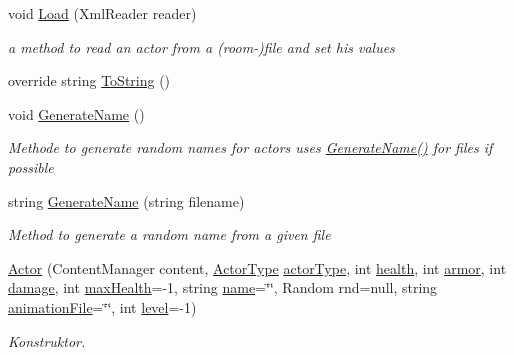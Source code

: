 \begin{DoxyCompactItemize}
void \hyperlink{class_gruppe22_1_1_backend_1_1_actor_abab30b54b556a93fb68044299f57a13f}{Load} (Xml\-Reader reader)
\begin{DoxyCompactList}\small\item\em a method to read an actor from a (room-\/)file and set his values \end{DoxyCompactList}\item 
override string \hyperlink{class_gruppe22_1_1_backend_1_1_actor_a8aee9e4883cce82a031244e62a725077}{To\-String} ()
\item 
void \hyperlink{class_gruppe22_1_1_backend_1_1_actor_a91da621907674e6fd7403143a609e858}{Generate\-Name} ()
\begin{DoxyCompactList}\small\item\em Methode to generate random names for actors uses \hyperlink{class_gruppe22_1_1_backend_1_1_actor_a91da621907674e6fd7403143a609e858}{Generate\-Name()} for files if possible \end{DoxyCompactList}\item 
string \hyperlink{class_gruppe22_1_1_backend_1_1_actor_ab355b820e866805831fde9aa92064549}{Generate\-Name} (string filename)
\begin{DoxyCompactList}\small\item\em Method to generate a random name from a given file \end{DoxyCompactList}\item 
\hyperlink{class_gruppe22_1_1_backend_1_1_actor_ab11640b7f9bced587bf5a568197194c4}{Actor} (Content\-Manager content, \hyperlink{namespace_gruppe22_1_1_backend_a56d8f7bd1b5ba29d421c27a959523af3}{Actor\-Type} \hyperlink{class_gruppe22_1_1_backend_1_1_actor_a58c387d62c241bbafdb677144f121afb}{actor\-Type}, int \hyperlink{class_gruppe22_1_1_backend_1_1_actor_a46f3a7d62de83a6bf3c44cd52f38af9b}{health}, int \hyperlink{class_gruppe22_1_1_backend_1_1_actor_ab400f0b82f96d2334891d7cd428f5d08}{armor}, int \hyperlink{class_gruppe22_1_1_backend_1_1_actor_a461e2480a59de23517c3b375dede10fb}{damage}, int \hyperlink{class_gruppe22_1_1_backend_1_1_actor_aac0f2f9a2f0b314f98ba19d0b38a7a97}{max\-Health}=-\/1, string \hyperlink{class_gruppe22_1_1_backend_1_1_actor_a28129eaf9d70d9bfc33a29544ba74edf}{name}=\char`\"{}\char`\"{}, Random rnd=null, string \hyperlink{class_gruppe22_1_1_backend_1_1_actor_a95b868d16d310a817634fe8498ad9667}{animation\-File}=\char`\"{}\char`\"{}, int \hyperlink{class_gruppe22_1_1_backend_1_1_actor_aef8ca8637a54602399de1b2d08670c9e}{level}=-\/1)
\begin{DoxyCompactList}\small\item\em Konstruktor. \end{DoxyCompactList}\end{DoxyCompactItemize}
